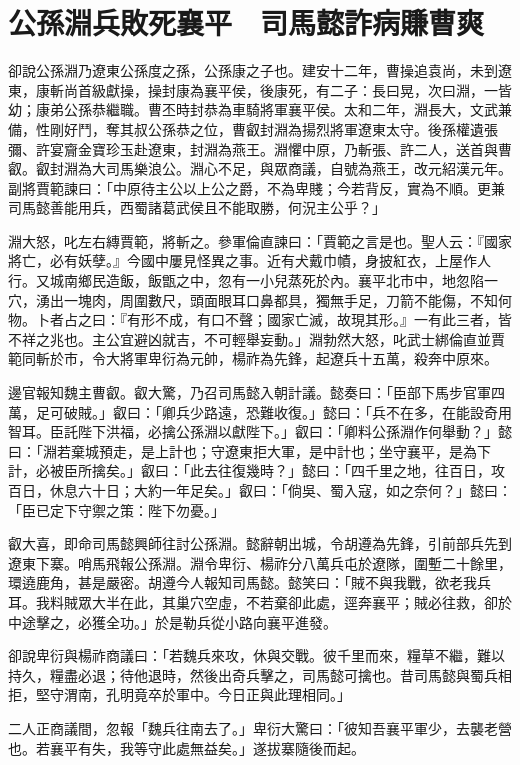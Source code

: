 
\chapter{公孫淵兵敗死襄平　司馬懿詐病賺曹爽}

卻說公孫淵乃遼東公孫度之孫，公孫康之子也。建安十二年，曹操追袁尚，未到遼東，康斬尚首級獻操，操封康為襄平侯，後康死，有二子：長曰晃，次曰淵，一皆幼；康弟公孫恭繼職。曹丕時封恭為車騎將軍襄平侯。太和二年，淵長大，文武兼備，性剛好鬥，奪其叔公孫恭之位，曹叡封淵為揚烈將軍遼東太守。後孫權遺張彌、許宴齎金寶珍玉赴遼東，封淵為燕王。淵懼中原，乃斬張、許二人，送首與曹叡。叡封淵為大司馬樂浪公。淵心不足，與眾商議，自號為燕王，改元紹漢元年。副將賈範諫曰：「中原待主公以上公之爵，不為卑賤；今若背反，實為不順。更兼司馬懿善能用兵，西蜀諸葛武侯且不能取勝，何況主公乎？」

淵大怒，叱左右縳賈範，將斬之。參軍倫直諫曰：「賈範之言是也。聖人云：『國家將亡，必有妖孽。』今國中屢見怪異之事。近有犬戴巾幘，身披紅衣，上屋作人行。又城南鄉民造飯，飯甑之中，忽有一小兒蒸死於內。襄平北市中，地忽陷一穴，湧出一塊肉，周圍數尺，頭面眼耳口鼻都具，獨無手足，刀箭不能傷，不知何物。卜者占之曰：『有形不成，有口不聲；國家亡滅，故現其形。』一有此三者，皆不祥之兆也。主公宜避凶就吉，不可輕舉妄動。」淵勃然大怒，叱武士綁倫直並賈範同斬於市，令大將軍卑衍為元帥，楊祚為先鋒，起遼兵十五萬，殺奔中原來。

邊官報知魏主曹叡。叡大驚，乃召司馬懿入朝計議。懿奏曰：「臣部下馬步官軍四萬，足可破賊。」叡曰：「卿兵少路遠，恐難收復。」懿曰：「兵不在多，在能設奇用智耳。臣託陛下洪福，必擒公孫淵以獻陛下。」叡曰：「卿料公孫淵作何舉動？」懿曰：「淵若棄城預走，是上計也；守遼東拒大軍，是中計也；坐守襄平，是為下計，必被臣所擒矣。」叡曰：「此去往復幾時？」懿曰：「四千里之地，往百日，攻百日，休息六十日；大約一年足矣。」叡曰：「倘吳、蜀入寇，如之奈何？」懿曰：「臣已定下守禦之策：陛下勿憂。」

叡大喜，即命司馬懿興師往討公孫淵。懿辭朝出城，令胡遵為先鋒，引前部兵先到遼東下寨。哨馬飛報公孫淵。淵令卑衍、楊祚分八萬兵屯於遼隊，圍塹二十餘里，環遶鹿角，甚是嚴密。胡遵今人報知司馬懿。懿笑曰：「賊不與我戰，欲老我兵耳。我料賊眾大半在此，其巢穴空虛，不若棄卻此處，逕奔襄平；賊必往救，卻於中途擊之，必獲全功。」於是勒兵從小路向襄平進發。

卻說卑衍與楊祚商議曰：「若魏兵來攻，休與交戰。彼千里而來，糧草不繼，難以持久，糧盡必退；待他退時，然後出奇兵擊之，司馬懿可擒也。昔司馬懿與蜀兵相拒，堅守渭南，孔明竟卒於軍中。今日正與此理相同。」

二人正商議間，忽報「魏兵往南去了。」卑衍大驚曰：「彼知吾襄平軍少，去襲老營也。若襄平有失，我等守此處無益矣。」遂拔寨隨後而起。

